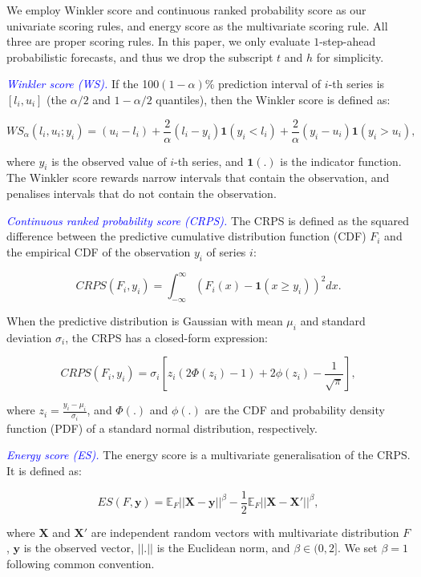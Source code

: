 \documentclass[
  11pt,
  letterpaper,
  DIV=11,
  numbers=noendperiod,
  titlepage]{scrartcl}
\begin{document}
We employ Winkler score and continuous ranked probability score as our
univariate scoring rules, and energy score as the multivariate scoring
rule. All three are proper scoring rules. In this paper, we only
evaluate \(1\)-step-ahead probabilistic forecasts, and thus we drop the
subscript \(t\) and \(h\) for simplicity.

\textcolor{blue}{\textit{Winkler score (WS).}} If the
100\((1-\alpha)\)\% prediction interval of \(i\)-th series is
\([l_i, u_i]\) (the \(\alpha / 2\) and \(1 - \alpha / 2\) quantiles),
then the Winkler score is defined as:

\[
WS_{\alpha}(l_i, u_i; y_i) = (u_i - l_i) + \frac{2}{\alpha} (l_i - y_i) \boldsymbol{1}(y_i < l_i) + \frac{2}{\alpha} (y_i - u_i) \boldsymbol{1}(y_i > u_i),
\]

where \(y_i\) is the observed value of \(i\)-th series, and
\(\boldsymbol{1}(.)\) is the indicator function. The Winkler score
rewards narrow intervals that contain the observation, and penalises
intervals that do not contain the observation.

\textcolor{blue}{\textit{Continuous ranked probability score (CRPS).}}
The CRPS is defined as the squared difference between the predictive
cumulative distribution function (CDF) \(F_i\) and the empirical CDF of
the observation \(y_i\) of series \(i\):

\[
CRPS(F_i, y_i) = \int_{-\infty}^{\infty} (F_i(x) - \boldsymbol{1}(x \geq y_i))^2 dx.
\]

When the predictive distribution is Gaussian with mean \(\mu_i\) and
standard deviation \(\sigma_i\), the CRPS has a closed-form expression:

\[
CRPS(F_i, y_i) = \sigma_i \left[ z_i \left( 2 \Phi(z_i) -1 \right) + 2 \phi(z_i) - \frac{1}{\sqrt{\pi}} \right],
\]

where \(z_i = \frac{y_i - \mu_i}{\sigma_i}\), and \(\Phi(.)\) and
\(\phi(.)\) are the CDF and probability density function (PDF) of a
standard normal distribution, respectively.

\textcolor{blue}{\textit{Energy score (ES).}} The energy score is a
multivariate generalisation of the CRPS. It is defined as:

\[
ES(F, \boldsymbol{y}) = \mathbb{E}_F ||\boldsymbol{X} - \boldsymbol{y}||^{\beta} - \frac{1}{2} \mathbb{E}_F ||\boldsymbol{X} - \boldsymbol{X}'||^{\beta},
\]

where \(\boldsymbol{X}\) and \(\boldsymbol{X}'\) are independent random
vectors with multivariate distribution \(F\), \(\boldsymbol{y}\) is the
observed vector, \(||.||\) is the Euclidean norm, and
\(\beta \in (0, 2]\). We set \(\beta = 1\) following common convention.
\end{document}
